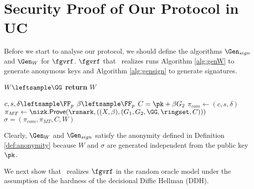\section{Security Proof of Our Protocol in UC}
Before we start to analyse our protocol, we should define the algorithms $ \Gen_{sign} $ and $ \Gen_W $ for $ \fgvrf $. $ \fgvrf $ that \name \ realizes runs Algorithm \ref{alg:genW} to generate  anonymous keys and Algorithm \ref{alg:gensign} to generate signatures.



\begin{algorithm}
	\caption{$\Gen_{W}(\ringset,\pk,m)$}
	\label{alg:genW}	 	
	\begin{algorithmic}[1]
		\State$ W \leftsample\GG $
		\State \textbf{return} $ W $
	\end{algorithmic}
	
\end{algorithm}

\begin{algorithm}
	\caption{$\Gen_{sign}(\ringset,W,\pk,m)$}
	\label{alg:gensign}	 	
	\begin{algorithmic}[1]
		\State $ c,s,\delta \leftsample \FF_p $
		\State $ \beta \leftsample \FF_p $
		\State $ C =  \pk + \beta G_2$
		\State $ \pi_{com}  \leftarrow (c,s,\delta)$
		\State $ \pi_{MT} \leftarrow \nizk.\mathsf{Prove}(\rsnark, ((X, \beta),(G_1,G_2, \GG,\ringset, C))) $ 
		\State\Return$ \sigma = (\pi_{com},\pi_{MT},C,W) $
	\end{algorithmic}
	
\end{algorithm}

Clearly, $ \Gen_{W} $ and $ \Gen_{sign} $ satisfy the anonymity defined in Definition \ref{def:anonymity} because $ W $ and $ \sigma $ are generated independent from the public key $ \pk $.


We next show that \name \ realizes $ \fgvrf $  in the random oracle model under the assumption of the hardness of the decisional Diffie Hellman (DDH).

